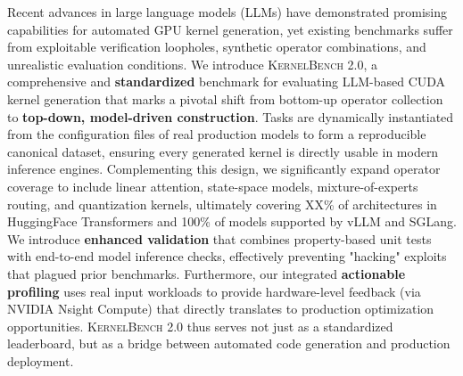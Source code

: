 Recent advances in large language models (LLMs) have demonstrated promising capabilities for automated GPU kernel generation, yet existing benchmarks suffer from exploitable verification loopholes, synthetic operator combinations, and unrealistic evaluation conditions.
We introduce \textsc{KernelBench 2.0}, a comprehensive and \textbf{standardized} benchmark for evaluating LLM-based CUDA kernel generation that marks a pivotal shift from bottom-up operator collection to \textbf{top-down, model-driven construction}.
Tasks are dynamically instantiated from the configuration files of real production models to form a reproducible canonical dataset, ensuring every generated kernel is directly usable in modern inference engines.
Complementing this design, we significantly expand operator coverage to include linear attention, state-space models, mixture-of-experts routing, and quantization kernels, ultimately covering XX\% of architectures in HuggingFace Transformers and 100\% of models supported by vLLM and SGLang.
We introduce \textbf{enhanced validation} that combines property-based unit tests with end-to-end model inference checks, effectively preventing "hacking" exploits that plagued prior benchmarks.
Furthermore, our integrated \textbf{actionable profiling} uses real input workloads to provide hardware-level feedback (via NVIDIA Nsight Compute) that directly translates to production optimization opportunities.
\textsc{KernelBench 2.0} thus serves not just as a standardized leaderboard, but as a bridge between automated code generation and production deployment.